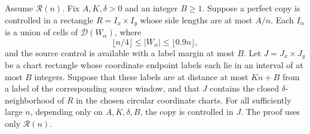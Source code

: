 \begin{lemma}\label{lem:window-bridge}
Assume $\mathcal R(n)$.  Fix $A,K,\delta>0$ and an integer $B\ge1$.
Suppose a perfect copy is controlled in a rectangle $R=I_x\times I_y$
whose side lengths are at most $A/n$.  Each $I_\alpha$ is a union of
cells of $\mathcal D(W_\alpha)$, where
\[
 \lfloor n/4\rfloor\le |W_\alpha|\le\lfloor0.9n\rfloor,
\]
and the source control is available with a label margin at most $B$.
Let $J=J_x\times J_y$ be a chart rectangle whose coordinate endpoint
labels each lie in an interval of at most $B$ integers.  Suppose that
these labels are at distance at most $Kn+B$ from a label of the
corresponding source window, and that $J$ contains the closed
$\delta$-neighborhood of $R$ in the chosen circular coordinate charts.
For all sufficiently large $n$, depending only on $A,K,\delta,B$,
the copy is controlled in $J$.  The proof uses only $\mathcal R(n)$.
\end{lemma}


